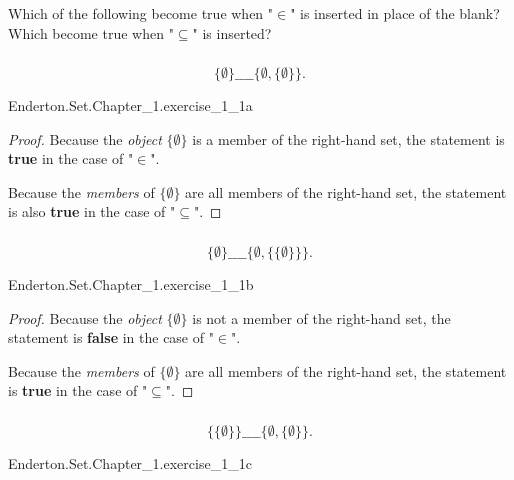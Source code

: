 \documentclass{report}
\begin{document}
  Which of the following become true when "$\in$" is inserted in place of the
    blank?
  Which become true when "$\subseteq$" is inserted?

\subsubsection{}%

  $$\{\emptyset\} \_\_\_\_ \{\emptyset, \{\emptyset\}\}.$$

    {Enderton.Set.Chapter\_1.exercise\_1\_1a}

  \begin{proof}
    Because the \textit{object} $\{\emptyset\}$ is a member of the right-hand
      set, the statement is \textbf{true} in the case of "$\in$".

    Because the \textit{members} of $\{\emptyset\}$ are all members of the
      right-hand set, the statement is also \textbf{true} in the case of
      "$\subseteq$".
  \end{proof}

\subsubsection{}%

  $$\{\emptyset\} \_\_\_\_ \{\emptyset, \{\{\emptyset\}\}\}.$$

    {Enderton.Set.Chapter\_1.exercise\_1\_1b}

  \begin{proof}
    Because the \textit{object} $\{\emptyset\}$ is not a member of the
      right-hand set, the statement is \textbf{false} in the case of "$\in$".

    Because the \textit{members} of $\{\emptyset\}$ are all members of the
      right-hand set, the statement is \textbf{true} in the case of
      "$\subseteq$".
  \end{proof}

\subsubsection{}%

  $$\{\{\emptyset\}\} \_\_\_\_ \{\emptyset, \{\emptyset\}\}.$$

    {Enderton.Set.Chapter\_1.exercise\_1\_1c}
\end{document}
